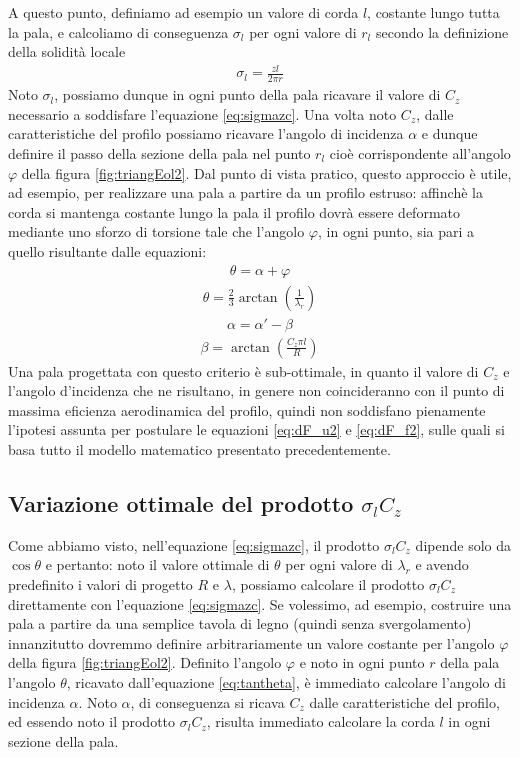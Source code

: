 A questo punto, definiamo ad esempio un valore di corda $l$, costante lungo  tutta la pala, e calcoliamo di conseguenza $\sigma_l$ per ogni valore di $r_l$ secondo la definizione della solidità locale
\begin{align*}
\sigma_l = \frac{z l}{2 \pi r}
\end{align*}
Noto $\sigma_l$, possiamo dunque in ogni punto della pala ricavare il valore di $C_z$ necessario a soddisfare l'equazione \ref{eq:sigmazc}. Una volta noto $C_z$, dalle caratteristiche del profilo possiamo ricavare l'angolo di incidenza $\alpha$ e dunque definire il passo della sezione della pala nel punto $r_l$ cioè corrispondente all'angolo $\varphi$ della figura \ref{fig:triangEol2}. Dal punto di vista pratico, questo approccio è utile, ad esempio, per realizzare una pala a partire da un profilo estruso: affinchè la corda si mantenga costante lungo la pala il profilo dovrà essere deformato mediante uno sforzo di torsione tale che l'angolo $\varphi$, in ogni punto, sia pari a quello risultante dalle equazioni:
\begin{align*}
\theta = \alpha + \varphi
\end{align*}
\begin{align*}
\theta = \frac{2}{3} \arctan \left( \frac{1}{\lambda_r} \right)
\end{align*}
\begin{align*}
\alpha = \alpha' - \beta
\end{align*}
\begin{align*}
\beta = \arctan \left( \frac{C_z \pi l}{R} \right)
\end{align*}
Una pala progettata con questo criterio è sub-ottimale, in quanto il valore di $C_z$ e l'angolo d'incidenza che ne risultano, in genere non coincideranno con il punto di massima eficienza aerodinamica del profilo, quindi non soddisfano pienamente l'ipotesi assunta per postulare le equazioni \ref{eq:dF_u2} e \ref{eq:dF_f2}, sulle quali si basa tutto il modello matematico presentato precedentemente.

\subsection{Variazione ottimale del prodotto $\sigma_l C_z$}
Come abbiamo visto, nell'equazione \ref{eq:sigmazc}, il prodotto $\sigma_l C_z$ dipende solo da $\cos \theta$ e pertanto: noto il valore ottimale di $\theta$ per ogni valore di $\lambda_r$ e avendo predefinito i valori di progetto $R$ e $\lambda$, possiamo calcolare il prodotto $\sigma_l C_z$ direttamente con l'equazione \ref{eq:sigmazc}. Se volessimo, ad esempio, costruire una pala a partire da una semplice tavola di legno (quindi senza svergolamento) innanzitutto dovremmo definire arbitrariamente un valore costante per l'angolo $\varphi$ della figura \ref{fig:triangEol2}. Definito l'angolo $\varphi$ e noto in ogni punto $r$ della pala l'angolo $\theta$, ricavato dall'equazione \ref{eq:tantheta}, è immediato calcolare l'angolo di incidenza $\alpha$. Noto $\alpha$, di conseguenza si ricava $C_z$ dalle caratteristiche del profilo, ed essendo noto il prodotto $\sigma_l C_z$, risulta immediato calcolare la corda $l$ in ogni sezione della pala.


